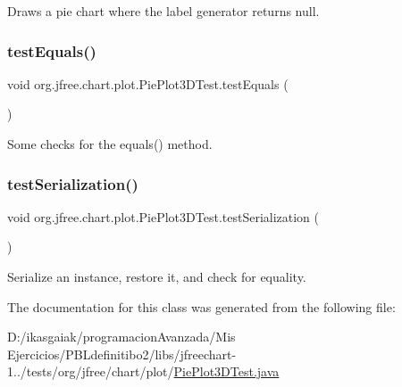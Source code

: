 Draws a pie chart where the label generator returns null. \mbox{\label{classorg_1_1jfree_1_1chart_1_1plot_1_1_pie_plot3_d_test_a25c8b56bef6b0cc98cf4babe2b0ea754}} 
\subsubsection{\texorpdfstring{test\+Equals()}{testEquals()}}
{\footnotesize\ttfamily void org.\+jfree.\+chart.\+plot.\+Pie\+Plot3\+D\+Test.\+test\+Equals (\begin{DoxyParamCaption}{ }\end{DoxyParamCaption})}

Some checks for the equals() method. \mbox{\label{classorg_1_1jfree_1_1chart_1_1plot_1_1_pie_plot3_d_test_adea65c99857121c9b36c02e29191322f}} 
\subsubsection{\texorpdfstring{test\+Serialization()}{testSerialization()}}
{\footnotesize\ttfamily void org.\+jfree.\+chart.\+plot.\+Pie\+Plot3\+D\+Test.\+test\+Serialization (\begin{DoxyParamCaption}{ }\end{DoxyParamCaption})}

Serialize an instance, restore it, and check for equality. 

The documentation for this class was generated from the following file\+:\begin{DoxyCompactItemize}
\item 
D\+:/ikasgaiak/programacion\+Avanzada/\+Mis Ejercicios/\+P\+B\+Ldefinitibo2/libs/jfreechart-\/1../tests/org/jfree/chart/plot/\mbox{\hyperlink{_pie_plot3_d_test_8java}{Pie\+Plot3\+D\+Test.\+java}}\end{DoxyCompactItemize}
